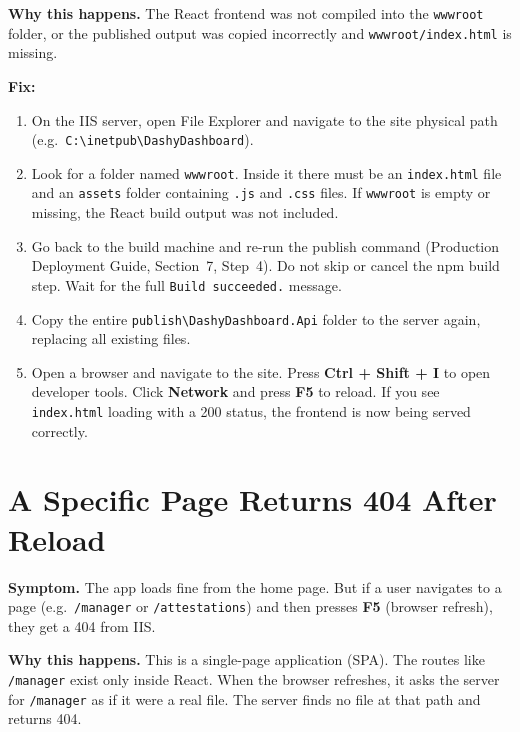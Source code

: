 \documentclass[a4paper,11pt]{article}
\begin{document}
\textbf{Why this happens.}
The React frontend was not compiled into the \texttt{wwwroot} folder,
or the published output was copied incorrectly and \texttt{wwwroot/index.html}
is missing.

\textbf{Fix:}

\begin{enumerate}
  \item On the IIS server, open File Explorer and navigate to the site physical path
        (e.g.\ \texttt{C:\textbackslash inetpub\textbackslash DashyDashboard}).
  \item Look for a folder named \texttt{wwwroot}.
        Inside it there must be an \texttt{index.html} file and an \texttt{assets}
        folder containing \texttt{.js} and \texttt{.css} files.
        If \texttt{wwwroot} is empty or missing, the React build output was not
        included.
  \item Go back to the build machine and re-run the publish command
        (Production Deployment Guide, Section~7, Step~4).
        Do not skip or cancel the npm build step.
        Wait for the full \texttt{Build succeeded.} message.
  \item Copy the entire \texttt{publish\textbackslash DashyDashboard.Api} folder
        to the server again, replacing all existing files.
  \item Open a browser and navigate to the site.
        Press \textbf{Ctrl + Shift + I} to open developer tools.
        Click \textbf{Network} and press \textbf{F5} to reload.
        If you see \texttt{index.html} loading with a 200 status, the frontend
        is now being served correctly.
\end{enumerate}

\section{A Specific Page Returns 404 After Reload}
\label{sec:404reload}

\textbf{Symptom.}
The app loads fine from the home page.
But if a user navigates to a page
(e.g.\ \texttt{/manager} or \texttt{/attestations})
and then presses \textbf{F5} (browser refresh), they get a 404 from IIS.

\textbf{Why this happens.}
This is a single-page application (SPA).
The routes like \texttt{/manager} exist only inside React.
When the browser refreshes, it asks the server for \texttt{/manager}
as if it were a real file. The server finds no file at that path and returns 404.
\end{document}
